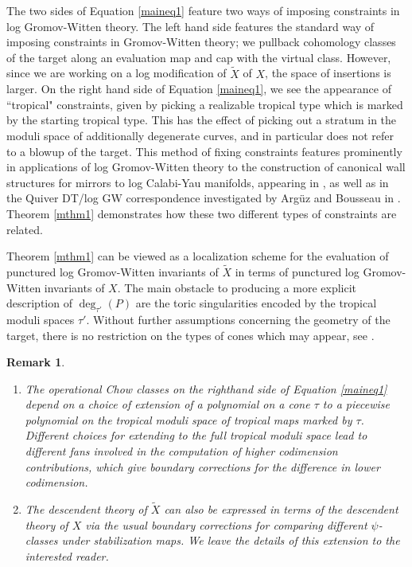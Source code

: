\documentclass[12pt, oneside]{amsart}   	%
\newcounter{thm}
\newtheorem{remark}[thm]{Remark}
\numberwithin{equation}{section}
\numberwithin{thm}{section}
\numberwithin{figure}{section}
\begin{document}
The two sides of Equation \ref{maineq1} feature two ways of imposing constraints in log Gromov-Witten theory. The left hand side features the standard way of imposing constraints in Gromov-Witten theory; we pullback cohomology classes of the target along an evaluation map and cap with the virtual class. However, since we are working on a log modification of $\widetilde{X}$ of $X$, the space of insertions is larger. On the right hand side of Equation \ref{maineq1}, we see the appearance of ``tropical" constraints, given by picking a realizable tropical type which is marked by the starting tropical type. This has the effect of picking out a stratum in the moduli space of additionally degenerate curves, and in particular does not refer to a blowup of the target. This method of fixing constraints features prominently in applications of log Gromov-Witten theory to the construction of canonical wall structures for mirrors to log Calabi-Yau manifolds, appearing in \cite{scatt}, as well as in the Quiver DT/log GW correspondence investigated by Arg\"uz and Bousseau in \cite{QDTlog}. Theorem \ref{mthm1} demonstrates how these two different types of constraints are related. 




Theorem \ref{mthm1} can be viewed as a localization scheme for the evaluation of punctured log Gromov-Witten invariants of $\widetilde{X}$ in terms of punctured log Gromov-Witten invariants of $X$. The main obstacle to producing a more explicit description of $\deg_{\tau'}(P)$ are the toric singularities encoded by the tropical moduli spaces $\tau'$. Without further assumptions concerning the geometry of the target, there is no restriction on the types of cones which may appear, see \cite{tropvak}. 
 
\begin{remark}
\begin{enumerate}
\item The operational Chow classes on the righthand side of Equation \ref{maineq1} depend on a choice of extension of a polynomial on a cone $\tau$ to a piecewise polynomial on the tropical moduli space of tropical maps marked by $\tau$. Different choices for extending to the full tropical moduli space lead to different fans involved in the computation of higher codimension contributions, which give boundary corrections for the difference in lower codimension.
 \item The descendent theory of $\widetilde{X}$ can also be expressed in terms of the descendent theory of $X$ via the usual boundary corrections for comparing different $\psi$-classes under stabilization maps. We leave the details of this extension to the interested reader.
\end{enumerate}
\end{remark}
\end{document}

